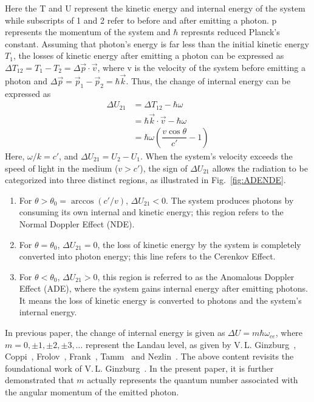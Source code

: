 \documentclass{cpbtex}
\begin{document}
\begin{CJK*}{GBK}{song}
Here the T and U represent the kinetic energy and internal energy of the system while subscripts of 1 and 2 refer to before and after emitting a photon. p represents the momentum of the system and $\hbar$ represnts reduced Planck's constant. Assuming that photon’s energy is far less than the initial kinetic energy $T_1$, the losses of kinetic energy after emitting a photon can be expressed as $\Delta T_{12} = T_1 - T_2 = \Delta\vec{ p} \cdot \vec{v}$, where v is the velocity of the system before emitting a photon and $\Delta\vec{ p} = \vec{p}_1 - \vec{p}_2 = \hbar \vec{k}$. Thus, the change of internal energy can be expressed as 
\begin{equation} 
\begin{array}{rl}
\Delta U_{21} &= \Delta T_{12} - \hbar \omega \\
              &= \hbar \vec{k} \cdot \vec{v} - \hbar \omega \\
              &= \hbar \omega \left( \dfrac{v \cos \theta}{c'} - 1 \right)
\end{array} \label{eq:DeltaU00}
\end{equation}
Here, \(\omega / k = c'\), and \(\Delta U_{21} = U_2 - U_1\). When the system's velocity exceeds the speed of light in the medium (\(v > c'\)), the sign of \(\Delta U_{21}\) allows the radiation to be categorized into three distinct regions, as illustrated in Fig.~\ref{fig:ADENDE}.
\begin{enumerate}
\item For $\theta > \theta_0 = \arccos(c'/v)$, $\Delta U_{21} < 0$. The system produces photons by consuming its own internal and kinetic energy; this region refers to the Normal Doppler Effect (NDE).
\item For $\theta = \theta_0$, $\Delta U_{21} = 0$, the loss of kinetic energy by the system is completely converted into photon energy; this line refers to the Cerenkov Effect.
\item For $\theta < \theta_0$, $\Delta U_{21} > 0$, this region is referred to as the Anomalous Doppler Effect (ADE), where the system gains internal energy after emitting photons. It means the loss of kinetic energy is converted to photons and the system's internal energy.
\end{enumerate}
In previous paper, the change of internal energy is given as $\Delta U = m\hbar\omega_{ce}$, where $m = 0, \pm1, \pm2, \pm3, \ldots$ represent the Landau level, as given by V.\,L. Ginzburg~\cite{ginzburg2005radiation}, Coppi~\cite{coppi1976slide}, Frolov~\cite{frolov1986excitation}, Frank~\cite{frank1960optics}, Tamm~\cite{tamm1959general} and Nezlin~\cite{nezlin1976negative}. The above content revisits the foundational work of V.\,L. Ginzburg~\cite{ginzburg2005radiation}. In the present paper, it is further demonstrated that $m$ actually represents the quantum number associated with the angular momentum of the emitted photon.


\end{CJK*}
\end{document}
